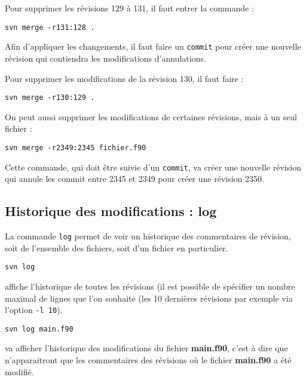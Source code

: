 \documentclass[a4paper,twoside]{article}
\begin{document}
\begin{attention}
Pour supprimer les révisions 129 à 131, il faut entrer la commande :
\begin{verbatim}
svn merge -r131:128 .
\end{verbatim}

Afin d'appliquer les changements, il faut faire un \texttt{commit} pour créer une nouvelle révision qui contiendra les modifications d'annulations.
\end{attention}

\begin{remarque}
Pour supprimer les modifications de la révision 130, il faut faire :
\begin{verbatim}
svn merge -r130:129 .
\end{verbatim}
\end{remarque}



\bigskip

On peut aussi supprimer les modifications de certaines révisions, mais à un seul fichier : 
\begin{verbatim}
svn merge -r2349:2345 fichier.f90
\end{verbatim}

Cette commande, qui doit être suivie d'un \texttt{commit}, va créer une nouvelle révision qui annule les commit entre 2345 et 2349 pour créer une révision 2350. 

\subsection{Historique des modifications : log}
La commande \texttt{log} permet de voir un historique des commentaires de révision, soit de l'ensemble des fichiers, soit d'un fichier en particulier.

\begin{verbatim}
svn log
\end{verbatim}
affiche l'historique de toutes les révisions (il est possible de spécifier un nombre maximal de lignes que l'on souhaite (les 10 dernières révisions par exemple via l'option \texttt{-l 10}). 

\begin{verbatim}
svn log main.f90
\end{verbatim}
va afficher l'historique des modifications du fichier \textbf{main.f90}, c'est à dire que n'apparaitront que les commentaires des révisions où le fichier \textbf{main.f90} a été modifié.
\end{document}
